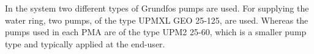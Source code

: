 % 		 

In the system two different types of Grundfos pumps are used. For supplying the water ring, two pumps, of the type UPMXL GEO 25-125\cite{waterpump1}, are used. Whereas the pumps used in each PMA are of the type UPM2 25-60\cite{waterpump2}, which is a smaller pump type and typically applied at the end-user. 


